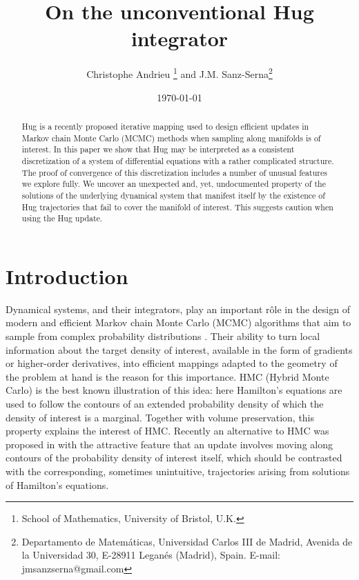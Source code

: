 \documentclass[10pt]{article}
\begin{document}
\title{On the unconventional Hug integrator}
\author{Christophe Andrieu \footnote{School of Mathematics, University of Bristol, U.K.} and J.M. Sanz-Serna\footnote{Departamento de Matem\'aticas, Universidad Carlos III de Madrid, Avenida de la
Universidad 30, E-28911 Legan\'es (Madrid), Spain. E-mail: jmsanzserna@gmail.com}}

\date{\today}
\maketitle
\begin{abstract} Hug is a recently proposed iterative mapping used to design efficient updates in Markov chain Monte Carlo (MCMC) methods when sampling along manifolds is of interest. In this paper we show that Hug may be interpreted as a consistent discretization of a system of
differential equations with a rather complicated structure. The proof of convergence of this discretization includes a number of unusual features we explore fully. We uncover an unexpected and, yet, undocumented property of the solutions of the underlying dynamical system that manifest itself by the existence of Hug trajectories that fail to cover the manifold of interest. This suggests caution when
using the Hug update.
\end{abstract}
\section{Introduction}

Dynamical systems, and their integrators, play an important rôle in
the design of modern and efficient Markov chain Monte Carlo (MCMC)
algorithms that aim to sample from complex probability distributions
\cite{youhan-serna-2014}. Their ability to turn local information
about the target density of interest, available in the form of gradients
or higher-order derivatives, into efficient mappings adapted to the
geometry of the problem at hand is the reason for this importance.
HMC (Hybrid Monte Carlo) \cite{duane1987hybrid} is the
best known illustration of this idea: here Hamilton's equations are
used to follow the contours of an extended probability density of
which the density of interest is a marginal. Together with volume
preservation, this property explains the interest of HMC. Recently
an alternative to HMC was proposed in \cite{LS23} with the attractive
feature that an update involves moving along contours of the probability
density of interest itself, which should be contrasted with the corresponding,
sometimes unintuitive, trajectories arising from solutions of Hamilton's
equations.
\end{document}
